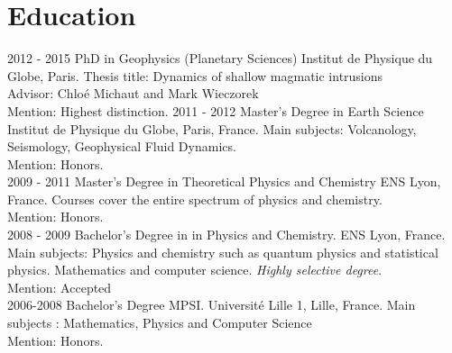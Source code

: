 \documentclass[]{friggeri-cv}
\begin{document}
\section{Education}
\begin{entrylist}
  \entry
    {2012 - 2015}
    {PhD in Geophysics (Planetary Sciences)}
    {Institut de Physique du Globe, Paris.}
    {Thesis title: Dynamics of shallow magmatic intrusions\\
    Advisor: Chloé Michaut and Mark Wieczorek\\
    Mention: Highest distinction.}
  \entry
    {2011 - 2012}
    {Master's Degree in Earth Science}
    {Institut de Physique du Globe, Paris, France.}
    {Main subjects: Volcanology, Seismology, Geophysical Fluid Dynamics.\\
    Mention: Honors. \\}
  \entry
    {2009 - 2011}
    {Master's Degree in Theoretical Physics and Chemistry}
    {ENS Lyon, France.}
    {Courses cover the entire spectrum of physics and chemistry.\\
    Mention: Honors.\\}
  \entry
    {2008 - 2009}
    {Bachelor's Degree in in Physics and Chemistry.}
    {ENS Lyon, France.}
    {Main subjects: Physics and chemistry such as quantum physics and statistical physics.  Mathematics and computer science. \emph{Highly selective degree}.\\
    Mention: Accepted\\}
  \entry
    {2006-2008}
    {Bachelor's Degree MPSI.}
    {Université Lille 1, Lille, France.}
    {Main subjects : Mathematics, Physics and Computer Science\\
    Mention: Honors.}
\end{entrylist}

\newpage
\end{document}
